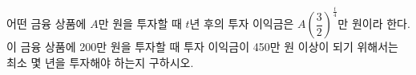 어떤 금융 상품에 $A$만 원을 투자할 때 $t$년 후의 투자 이익금은 $A\left(\dfrac{3}{2}\right)^{\frac{t}{4}}$만 원이라 한다. 이 금융 상품에 200만 원을 투자할 때 투자 이익금이 450만 원 이상이 되기 위해서는 최소 몇 년을 투자해야 하는지 구하시오.
